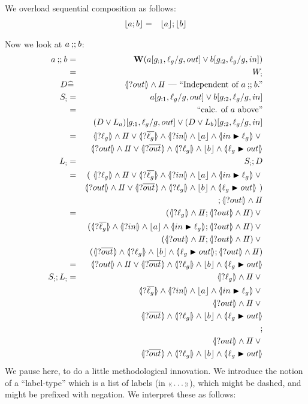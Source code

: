 We overload sequential composition as follows:
\begin{eqnarray*}
   \lfloor a;b\rfloor &=& \lfloor a\rfloor ; \lfloor b\rfloor
\end{eqnarray*}

Now we look at $a \mathbin{;\!;} b$:
\begin{eqnarray*}
   a \cseq b
   &=& \W(a[g_{:1},\ell_g/g,out] \lor b[g_{:2},\ell_g/g,in])
\\ &=& W_;
\\ D &\defs& \D \EOLC{Independent of $a\cseq b$.}
\\ S_; &=& a[g_{:1},\ell_g/g,out] \lor b[g_{:2},\ell_g/g,in]
\EQ{calc. of $a$ above}
\\ && (D \lor L_a)[g_{:1},\ell_g/g,out]
      \lor
      (D \lor L_b)[g_{:2},\ell_g/g,in]
\\&=& \LS{\ell_g} \land \Skip
      \lor \LS{\B{\ell_g}}
           \land \LS{in} \land \ado a \land \LUPD{in}{\ell_g} \lor {}
\\&& \LS{out} \land \Skip
      \lor \LS{\B{out}}
           \land \LS{\ell_g} \land \ado b \land \LUPD{\ell_g}{out}
\\ L_; &=& S_; ; D
\\ &=& (~\LS{\ell_g} \land \Skip
      \lor \LS{\B{\ell_g}}
           \land \LS{in} \land \ado a \land \LUPD{in}{\ell_g} \lor {}
\\&& \LS{out} \land \Skip
      \lor \LS{\B{out}}
           \land \LS{\ell_g} \land \ado b \land \LUPD{\ell_g}{out}~)
\\&& {} ; \LS{out} \land \Skip
\\ &=& (\LS{\ell_g} \land \Skip ; \LS{out} \land \Skip) \lor{}
\\ &&  (\LS{\B{\ell_g}}
       \land \LS{in} \land \ado a \land \LUPD{in}{\ell_g}
       ; \LS{out} \land \Skip) \lor {}
\\ &&  (\LS{out} \land \Skip ; \LS{out} \land \Skip )\lor {}
\\ &&  (\LS{\B{out}}
           \land \LS{\ell_g} \land \ado b \land \LUPD{\ell_g}{out}
           ; \LS{out} \land \Skip )
\\ &=& \LS{out} \land \Skip \lor
       \LS{\B{out}}
       \land \LS{\ell_g} \land \ado b \land \LUPD{\ell_g}{out}
\\ S_; ; L_; &=&
     \LS{\ell_g} \land \Skip \lor{}
\\&& \LS{\B{\ell_g}}
           \land \LS{in} \land \ado a \land \LUPD{in}{\ell_g} \lor {}
\\&& \LS{out} \land \Skip \lor {}
\\&&\LS{\B{out}}
           \land \LS{\ell_g} \land \ado b \land \LUPD{\ell_g}{out}
\\&& ;
\\&& \LS{out} \land \Skip \lor {}
\\&& \LS{\B{out}}
       \land \LS{\ell_g} \land \ado b \land \LUPD{\ell_g}{out}
\end{eqnarray*}
We pause here, to do a little methodological innovation.
We introduce the notion of a ``label-type''
which is a  list of labels (in ${\scriptscriptstyle\langle\!\langle} \dots {\scriptscriptstyle\rangle\!\rangle}$),
which might be dashed,
and might be prefixed with negation.
We interpret these as follows:


